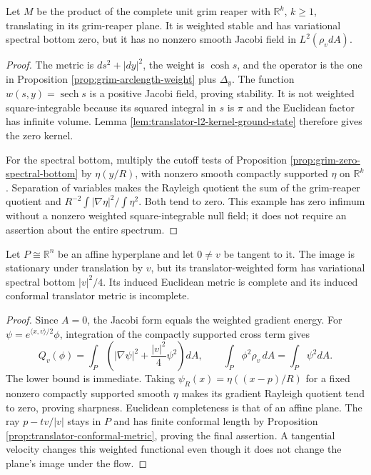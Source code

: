 \begin{proposition}\label{prop:grim-cylinder-l2-kernel}
Let $M$ be the product of the complete unit grim reaper with $\mathbb R^k$, $k\ge1$, translating in its grim-reaper plane. It is weighted stable and has variational spectral bottom zero, but it has no nonzero smooth Jacobi field in $L^2(\rho_vdA)$.
\end{proposition}
\begin{proof}
The metric is $ds^2+|dy|^2$, the weight is $\cosh s$, and the operator is the one in Proposition \ref{prop:grim-arclength-weight} plus $\Delta_y$. The function $w(s,y)=\operatorname{sech}s$ is a positive Jacobi field, proving stability. It is not weighted square-integrable because its squared integral in $s$ is $\pi$ and the Euclidean factor has infinite volume. Lemma \ref{lem:translator-l2-kernel-ground-state} therefore gives the zero kernel.

For the spectral bottom, multiply the cutoff tests of Proposition \ref{prop:grim-zero-spectral-bottom} by $\eta(y/R)$, with nonzero smooth compactly supported $\eta$ on $\mathbb R^k$. Separation of variables makes the Rayleigh quotient the sum of the grim-reaper quotient and
$R^{-2}\int|\nabla\eta|^2/\int\eta^2$. Both tend to zero. This example has zero infimum without a nonzero weighted square-integrable null field; it does not require an assertion about the entire spectrum.
\end{proof}

\begin{example}\label{ex:translator-plane-gap}
Let $P\cong\mathbb R^n$ be an affine hyperplane and let $0\ne v$ be tangent to it. The image is stationary under translation by $v$, but its translator-weighted form has variational spectral bottom $|v|^2/4$. Its induced Euclidean metric is complete and its induced conformal translator metric is incomplete.
\end{example}
\begin{proof}
Since $A=0$, the Jacobi form equals the weighted gradient energy. For $\psi=e^{\langle x,v\rangle/2}\phi$, integration of the compactly supported cross term gives
\[
 Q_v(\phi)=\int_P\left(|\nabla\psi|^2+\frac{|v|^2}{4}\psi^2\right)dA,
 \qquad \int_P\phi^2\rho_v\,dA=\int_P\psi^2dA.
\]
The lower bound is immediate. Taking $\psi_R(x)=\eta((x-p)/R)$ for a fixed nonzero compactly supported smooth $\eta$ makes its gradient Rayleigh quotient tend to zero, proving sharpness. Euclidean completeness is that of an affine plane. The ray $p-tv/|v|$ stays in $P$ and has finite conformal length by Proposition \ref{prop:translator-conformal-metric}, proving the final assertion. A tangential velocity changes this weighted functional even though it does not change the plane's image under the flow.
\end{proof}
